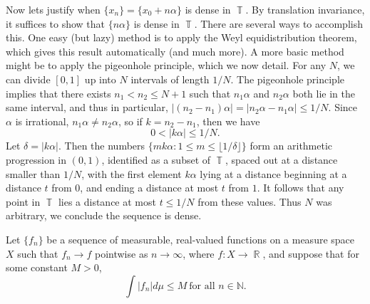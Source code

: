 \documentclass{exam}
\DeclareMathOperator{\RR}{\mathbb{R}}
\DeclareMathOperator{\TT}{\mathbb{T}}
\theoremstyle{problemstyle}
\newcommand{\1}[1]{\textbf{1}_{\left[#1\right]}} %
\begin{document}
\begin{questions}
\begin{solution}
	Now lets justify when $\{ x_n \} = \{ x_0 + n \alpha \}$ is dense in $\TT$. By translation invariance, it suffices to show that $\{ n \alpha \}$ is dense in $\TT$. There are several ways to accomplish this. One easy (but lazy) method is to apply the Weyl equidistribution theorem, which gives this result automatically (and much more). A more basic method might be to apply the pigeonhole principle, which we now detail. For any $N$, we can divide $[0,1]$ up into $N$ intervals of length $1/N$. The pigeonhole principle implies that there exists $n_1 < n_2 \leq N + 1$ such that $n_1 \alpha$ and $n_2 \alpha$ both lie in the same interval, and thus in particular, $|(n_2 - n_1) \alpha| = |n_2 \alpha - n_1 \alpha| \leq 1/N$. Since $\alpha$ is irrational, $n_1 \alpha \neq n_2 \alpha$, so if $k = n_2 - n_1$, then we have
	\[ 0 < |k \alpha| \leq 1/N. \]
	Let $\delta = |k \alpha|$. Then the numbers $\{ m k\alpha : 1 \leq m \leq \lfloor 1/\delta \rfloor \}$ form an arithmetic progression in $(0,1)$, identified as a subset of $\TT$, spaced out at a distance smaller than $1/N$, with the first element $k \alpha$ lying at a distance beginning at a distance $t$ from $0$, and ending a distance at most $t$ from $1$. It follows that any point in $\TT$ lies a distance at most $t \leq 1/N$ from these values. Thus $N$ was arbitrary, we conclude the sequence is dense.
\end{solution}

\question Let $\{ f_n \}$ be a sequence of measurable, real-valued functions on a measure space $X$ such that $f_n \to f$ pointwise as $n \to \infty$, where $f: X \to \RR$, and suppose that for some constant $M > 0$,
%
\[ \int |f_n| d\mu \leq M\ \text{for all $n \in \mathbb{N}$}. \]
\end{questions}
\end{document}
